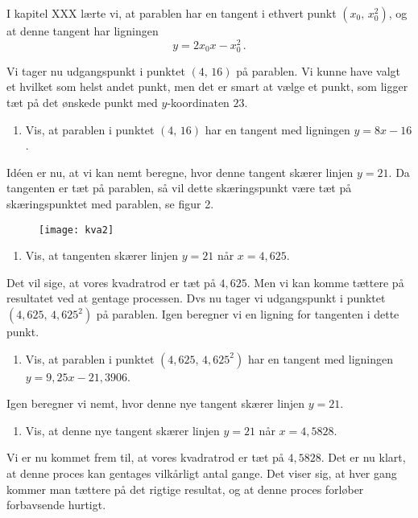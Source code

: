 \documentclass[12pt,oneside,a4paper]{article}
\theoremstyle{plain}
\begin{document}
I kapitel XXX lærte vi, at parablen har en tangent i ethvert punkt $(x_0,\,
x_0^2)$, og at denne tangent har ligningen
\[
    y=2x_0x - x_0^2 \,.
\]

Vi tager nu udgangspunkt i punktet $(4,\,16)$ på parablen. Vi kunne have valgt
et hvilket som helst andet punkt, men det er smart at vælge et punkt, som
ligger tæt på det ønskede punkt med $y$-koordinaten $23$.

\begin{enumerate}[label=(\alph*)]
    \item Vis, at parablen i punktet $(4,\,16)$ har en tangent med ligningen
        $y=8x-16$.
\end{enumerate}

Idéen er nu, at vi kan nemt beregne, hvor denne tangent skærer linjen $y=21$. 
Da tangenten er tæt på parablen, så vil dette skæringspunkt være tæt på 
skæringspunktet med parablen, se figur 2.

\begin{figure}[ht]
    \centering
    \texttt{[image: kva2]}
    \caption{}
    \label{fig2}
\end{figure}

\begin{enumerate}[label=(\alph*), resume]
    \item Vis, at tangenten skærer linjen $y=21$ når $x=4,625$.
\end{enumerate}

Det vil sige, at vores kvadratrod er tæt på $4,625$. Men vi kan
komme tættere på resultatet ved at gentage processen. Dvs nu tager vi
udgangspunkt i punktet $(4,625,\,4,625^2)$ på parablen. Igen beregner vi en ligning for tangenten i dette punkt.

\begin{enumerate}[label=(\alph*), resume]
    \item Vis, at parablen i punktet $(4,625,\,4,625^2)$ har en tangent med
        ligningen $y=9,25x-21,3906$.
\end{enumerate}
Igen beregner vi nemt, hvor denne nye tangent skærer linjen $y=21$.

\begin{enumerate}[label=(\alph*), resume]
    \item Vis, at denne nye tangent skærer linjen $y=21$ når $x=4,5828$.
\end{enumerate}

Vi er nu kommet frem til, at vores kvadratrod er tæt på $4,5828$.
Det er nu klart, at denne proces kan gentages vilkårligt antal gange.
Det viser sig, at hver gang kommer man tættere på det rigtige resultat, og
at denne proces forløber forbavsende hurtigt.
\end{document}
